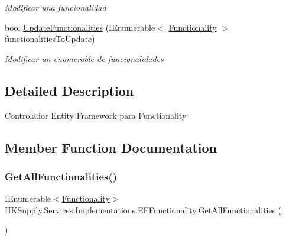 \begin{DoxyCompactItemize}
\begin{DoxyCompactList}\small\item\em Modificar una funcionalidad \end{DoxyCompactList}\item 
bool \mbox{\hyperlink{class_h_k_supply_1_1_services_1_1_implementations_1_1_e_f_functionality_a2093874e195260c8963796b45aeba022}{Update\+Functionalities}} (I\+Enumerable$<$ \mbox{\hyperlink{class_h_k_supply_1_1_models_1_1_functionality}{Functionality}} $>$ functionalities\+To\+Update)
\begin{DoxyCompactList}\small\item\em Modificar un enumerable de funcionalidades \end{DoxyCompactList}\end{DoxyCompactItemize}


\subsection{Detailed Description}
Controlador Entity Framework para Functionality 



\subsection{Member Function Documentation}
\mbox{\label{class_h_k_supply_1_1_services_1_1_implementations_1_1_e_f_functionality_ab92f666d01076cffafbddbb91c5cf6af}} 
\subsubsection{\texorpdfstring{Get\+All\+Functionalities()}{GetAllFunctionalities()}}
{\footnotesize\ttfamily I\+Enumerable$<$\mbox{\hyperlink{class_h_k_supply_1_1_models_1_1_functionality}{Functionality}}$>$ H\+K\+Supply.\+Services.\+Implementations.\+E\+F\+Functionality.\+Get\+All\+Functionalities (\begin{DoxyParamCaption}{ }\end{DoxyParamCaption})}



